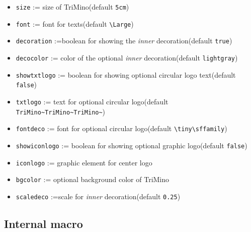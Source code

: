 \documentclass[11pt,a4paper]{ltxdoc}
\begin{document}
\begin{itemize}
	\item \lstinline[language={[latex]TeX},basicstyle=\ttfamily]|size| := size of \textsf{TriMino}\hfill(default \lstinline[language={[latex]TeX},basicstyle=\ttfamily]|5cm|)
	\item \lstinline[language={[latex]TeX},basicstyle=\ttfamily]|font| := font for texts\hfill(default \lstinline[language={[latex]TeX},basicstyle=\ttfamily]|\Large|)
	\item \lstinline[language={[latex]TeX},basicstyle=\ttfamily]|decoration| :=boolean for showing the \textit{inner} decoration\hfill(default \lstinline[language={[latex]TeX},basicstyle=\ttfamily]|true|)
	\item \lstinline[language={[latex]TeX},basicstyle=\ttfamily]|decocolor| := color of the optional \textit{inner} decoration\hfill(default \lstinline[language={[latex]TeX},basicstyle=\ttfamily]|lightgray|)
	\item \lstinline[language={[latex]TeX},basicstyle=\ttfamily]|showtxtlogo| := boolean for showing optional circular logo text\hfill(default \lstinline[language={[latex]TeX},basicstyle=\ttfamily]|false|)
	\item \lstinline[language={[latex]TeX},basicstyle=\ttfamily]|txtlogo| := text for optional circular logo\hfill(default \lstinline[language={[latex]TeX},basicstyle=\ttfamily]|TriMino~TriMino~TriMino~|)
	\item \lstinline[language={[latex]TeX},basicstyle=\ttfamily]|fontdeco| := font for optional circular logo\hfill(default \lstinline[language={[latex]TeX},basicstyle=\ttfamily]|\tiny\sffamily|)
	\item \lstinline[language={[latex]TeX},basicstyle=\ttfamily]|showiconlogo| := boolean for showing optional graphic logo\hfill(default \lstinline[language={[latex]TeX},basicstyle=\ttfamily]|false|)
	\item \lstinline[language={[latex]TeX},basicstyle=\ttfamily]|iconlogo| := graphic element for center logo
	\item \lstinline[language={[latex]TeX},basicstyle=\ttfamily]|bgcolor| := optional background color of \textsf{TriMino}
	\item \lstinline[language={[latex]TeX},basicstyle=\ttfamily]|scaledeco| :=scale for \textit{inner} decoration\hfill(default \lstinline[language={[latex]TeX},basicstyle=\ttfamily]|0.25|)
\end{itemize}

\subsection{Internal macro}
\end{document}
